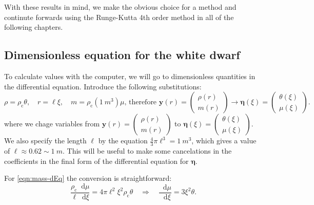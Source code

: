 \documentclass[]{article}
\newcommand{\dd}{\mathop{}\!\mathrm{d}}
\renewcommand{\vec}[1]{\boldsymbol{#1}}
\newcommand{\rhoCentre}{\rho_\mathrm{c}}
\begin{document}
	With these results in mind, we make the obvious choice for a method and continute forwards using the Runge-Kutta 4th order method in all of the following chapters.


\subsection{Dimensionless equation for the white dwarf}
	To calculate values with the computer, we will go to dimensionless quantities in the differential equation. Introduce the following substitutions:
	\begin{equation}
		\rho = \rhoCentre \theta, \quad r = \ell \xi, \quad m = \rhoCentre (\SI{1}{m^3}) \mu \text{, therefore } \vec{y}(r) = \begin{pmatrix}\rho(r) \\ m(r)\end{pmatrix} \rightarrow \vec{\eta}(\xi) = \begin{pmatrix}\theta(\xi)\\\mu(\xi)\end{pmatrix}.
	\end{equation}
	where we chage variables from $\vec{y}(r) = \begin{pmatrix}\rho(r) \\ m(r)\end{pmatrix}$ to $\vec{\eta}(\xi) = \begin{pmatrix}\theta(\xi)\\\mu(\xi)\end{pmatrix}$. We also specify the length $\ell$ by the equation $\frac{4}{3}\pi \ell^3 = \SI{1}{m^3}$, which gives a value of $\ell \approx 0.62 \sim \SI{1}{m}$. This will be useful to make some cancelations in the coefficients in the final form of the differential equation for $\vec{\eta}$.

	For \eqref{eqn:mass-dEq}  the conversion is straightforward:
	\begin{equation}
		\frac{\rhoCentre \dd \mu}{\ell \dd \xi} = 4 \pi \ell^2 \xi^2 \rhoCentre \theta \quad \Rightarrow \quad \frac{\dd \mu}{\dd \xi} = 3 \xi^2 \theta.
	\end{equation}
\end{document}
